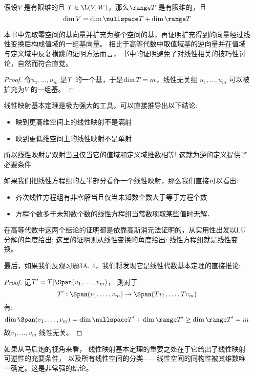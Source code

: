 \begin{theorem}
  假设\(V\) 是有限维的且 \(T \in \L(V,W)\)，那么\(\range
  T\) 是有限维的，且\[
    \dim V = \dim \nullspace T + \dim \range T
  \]
\end{theorem}
本书中先取零空间的基向量并扩充为整个空间的基，再证明扩充得到的向量经过线性变换后构成值域的一组基向量。
相比于高等代数中取值域基的逆向量并在值域与定义域中反复横跳的证明方法而言，
书中的证明避免了对线性相关的技巧性讨论，自然而符合直觉。

\begin{proof}
  令\(u_1, \dots , u_{m}\) 是\(\null T\) 的一个基，于是\(\dim
  \null T = m\)，线性无关组 \(u_{1}, \dots ,u_{m}\) 可以被扩充为\(V\) 的一组基。
\end{proof}

线性映射基本定理是极为强大的工具，可以直接推导出以下结论:

\begin{itemize}
  \item 映到更高维空间上的线性映射不是满射
  \item 映到更低维空间上的线性映射不是单射
\end{itemize}
所以线性映射是双射当且仅当它的值域和定义域维数相等! 这就为逆的定义提供了必要条件

如果我们把线性方程组的左半部分看作一个线性映射，那么我们直接可以看出:
\begin{itemize}
  \item 齐次线性方程组有非零解当且仅当未知数个数大于等于方程个数
  \item 方程个数多于未知数个数的线性方程组当常数项取某些值时无解．
\end{itemize}

在高等代数中这两个结论的证明都是依靠高斯消元法证明的，从实用性出发以LU分解的角度给出;
这里的证明则从线性变换的角度给出: 线性方程组就是线性变换。

最后，如果我们反观习题3A. 4，我们将发现它是线性代数基本定理的直接推论:
\begin{proof}
  记\(T'= T|\Span(v_{1}, \dots, v_{m})\)，
  则对于\[T': \Span(v_{1}, \dots, v_{m}) \to
  \Span(Tv_{1}, \dots, Tv_{m})\]
  有:
  \[
    \dim \Span(v_{1}, \dots, v_{m}) = \dim
    \nullspace T' +
    \dim \range T' \geq \dim \range T' = m
  \]
  故\(v_{1}, \dots, v_{m}\) 线性无关。
\end{proof}

如果从马后炮的视角来看，
线性映射基本定理的重要之处在于它给出了线性映射可逆性的充要条件，
以及所有线性空间的分类——线性空间的同构性被其维数唯一确定。这是非常强的结论。

